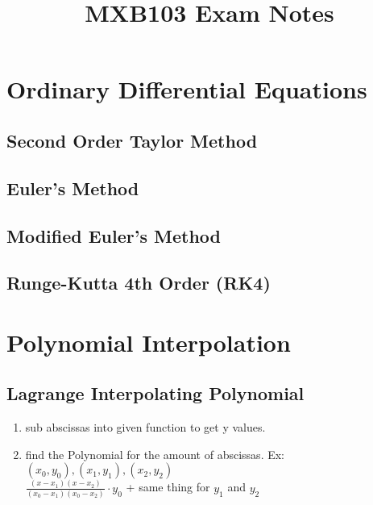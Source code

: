 \documentclass[10pt]{article}
\title{\vspace{-4ex}MXB103 Exam Notes\vspace{-1ex}}
\author{}
\date{}
\begin{document}
\maketitle
\thispagestyle{empty} %

\begin{multicols}{2} %

\section*{Ordinary Differential Equations}
\subsection*{Second Order Taylor Method}


\subsection*{Euler's Method}


\subsection*{Modified Euler's Method}


\subsection*{Runge-Kutta 4th Order (RK4)}

\columnbreak

\section*{Polynomial Interpolation}

\subsection*{Lagrange Interpolating Polynomial}
\begin{enumerate}
    \item sub abscissas into given function to get y values.
    \item find the Polynomial for the amount of abscissas. Ex: $ (x_{0}, y_{0}), (x_{1},y_{1}), (x_{2},y_{2}) $\\ $ \frac{(x - x_{1})(x-x_{2})}{(x_{0}-x_{1})(x_{0}-x_{2})} \cdot y_{0} $ + same thing for $ y_{1} $ and $ y_{2} $
\end{enumerate}



\end{multicols}
\end{document}
